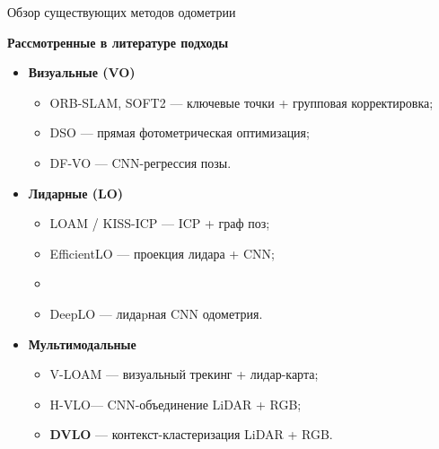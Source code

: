 \documentclass{beamer} %
\begin{document}
\begin{frame}{Обзор существующих методов одометрии}
  \footnotesize{

  \textbf{Рассмотренные в литературе подходы}

  \begin{itemize}
      \item \textbf{Визуальные (VO)}  
            \begin{itemize}
                \item ORB-SLAM, SOFT2 --- ключевые точки + групповая корректировка;  
                \item DSO --- прямая фотометрическая оптимизация;  
                \item DF-VO --- CNN-регрессия позы.
            \end{itemize}

      \item \textbf{Лидарные (LO)}  
            \begin{itemize}
                \item LOAM / KISS-ICP --- ICP + граф поз;  
                \item EfficientLO --- проекция лидара + CNN;  
                \item \item DeepLO --- лидаpная CNN одометрия.
            \end{itemize}

      \item \textbf{Мультимодальные}  
            \begin{itemize}
                \item V-LOAM --- визуальный трекинг + лидар-карта;  
                \item H-VLO--- CNN-объединение LiDAR + RGB;
                \item \textbf{DVLO} --- контекст-кластеризация LiDAR + RGB.
            \end{itemize}
  \end{itemize}
  }
\end{frame}
\end{document}

